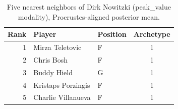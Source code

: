 \begin{table}[htbp]
  \centering\small
  \begin{tabular}{rllc}
    \toprule
    Rank & Player & Position & Archetype \\
    \midrule
    1 & Mirza Teletovic & F & 1 \\
    2 & Chris Bosh & F & 1 \\
    3 & Buddy Hield & G & 1 \\
    4 & Kristaps Porzingis & F & 1 \\
    5 & Charlie Villanueva & F & 1 \\
    \bottomrule
  \end{tabular}
  \caption{Five nearest neighbors of Dirk Nowitzki (peak_value modality), Procrustes-aligned posterior mean.}
  \label{tab:Dirk_Nowitzki_neighbors_peak_value}
\end{table}

